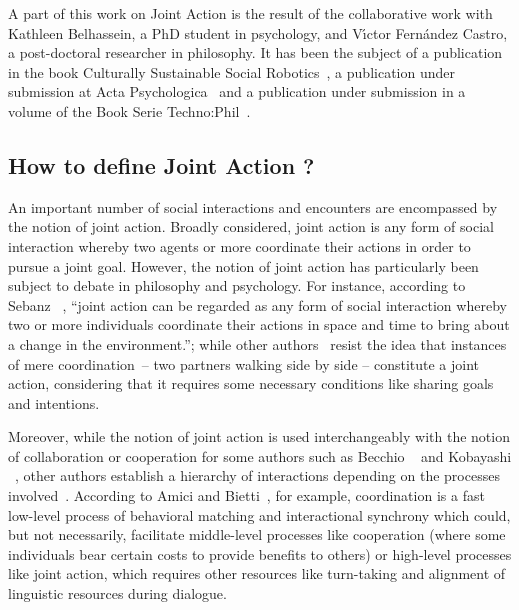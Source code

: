 \documentclass[a4paper,11pt,twoside]{StyleThese}
\begin{document}
A part of this work on Joint Action is the result of the collaborative work with Kathleen Belhassein, a PhD student in psychology, and V{\'\i}ctor Fern{\'a}ndez Castro, a post-doctoral researcher in philosophy. It has been the subject of a publication in the book Culturally Sustainable Social Robotics~\cite{belhassein_2020_horizontal}, a publication under submission at Acta Psychologica~\cite{belhassein_2021_adressing} and a publication under submission in a volume of the Book Serie Techno:Phil~\cite{castro_2021_adressing}.

\subsection{How to define Joint Action ?}

An important number of social interactions and encounters are encompassed by the notion of joint action. Broadly considered, joint action is any form of social interaction whereby two agents or more coordinate their actions in order to pursue a joint goal. However, the notion of joint action has particularly been subject to debate in philosophy and psychology. For instance, according to Sebanz \etal~\cite[p.~70]{sebanz_2006_joint}, ``joint action can be regarded as
any form of social interaction whereby two or more individuals coordinate their actions in space and time to bring about a change in the environment.''; while other authors~\cite{carpenter_2009_just, cohen_1991_teamwork, fiebich_2013_joint, tomasello_2005_understanding,pacherie_2012_agency} resist the idea that instances of mere coordination – \eg two partners walking side by side – constitute a joint action, considering that it requires some necessary conditions like sharing goals and intentions.

Moreover, while the notion of joint action is used interchangeably with the notion of collaboration or cooperation for some authors such as Becchio \etal~\cite{becchio_2010_toward} and Kobayashi \etal~\cite{kobayashi_2018_language}, other authors establish a hierarchy of interactions depending on the processes involved~\cite{amici_2015_coordination, chalmeau_1995_cooperation}. According to Amici and Bietti~\cite{amici_2015_coordination}, for example, coordination is a fast low-level process of behavioral matching and interactional synchrony which could, but not necessarily, facilitate middle-level processes like cooperation (where some individuals bear certain costs to provide benefits to others) or high-level processes like joint action, which requires other resources like turn-taking and alignment of linguistic resources during dialogue.
\end{document}
